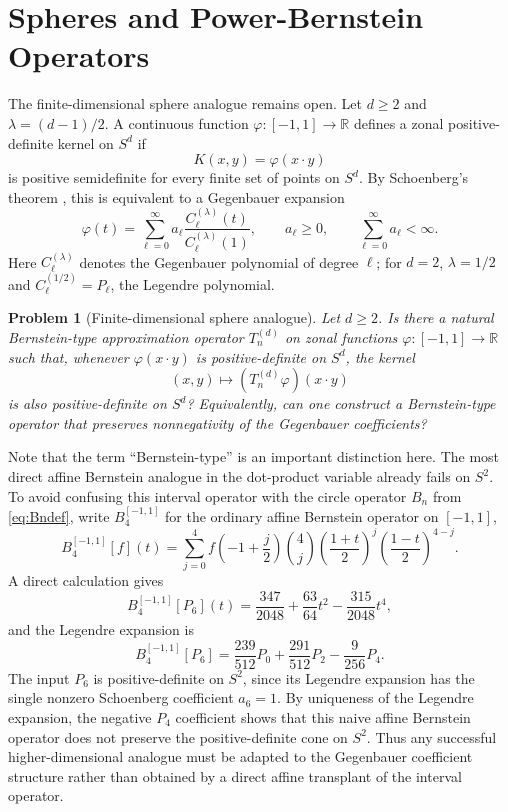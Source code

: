 \documentclass[10pt,a4paper]{amsart}
\newtheorem{problem}[theorem]{Problem}
\begin{document}
\section{Spheres and Power-Bernstein Operators}

The finite-dimensional sphere analogue remains open. Let $d \ge 2$ and $\lambda = (d-1)/2 $. A continuous function $\varphi:[-1,1] \to \mathbb R$ defines a zonal positive-definite kernel on $S^d$ if
\[
K(x,y)=\varphi(x\cdot y)
\]
is positive semidefinite for every finite set of points on $S^d$. By Schoenberg's theorem \cite{Schoenberg1942PositiveDF,Gneiting2013Spheres}, this is equivalent to a Gegenbauer expansion
\[
\varphi(t)=\sum_{\ell=0}^{\infty} a_\ell
\frac{C_\ell^{(\lambda)}(t)}{C_\ell^{(\lambda)}(1)},
\qquad a_\ell\ge0,
\qquad \sum_{\ell=0}^{\infty}a_\ell<\infty.
\]
Here $C_\ell^{(\lambda)}$ denotes the Gegenbauer polynomial of degree $\ell$; for $d=2$, $\lambda=1/2$ and $C_\ell^{(1/2)}=P_\ell$, the Legendre polynomial.

\begin{problem}[Finite-dimensional sphere analogue]
\label{conj:spheres}
Let $d\ge2$. Is there a natural Bernstein-type approximation operator $T_n^{(d)}$ on zonal functions $\varphi:[-1,1]\to\mathbb R$ such that, whenever $\varphi(x\cdot y)$ is positive-definite on $S^d$, the kernel
\[
(x,y)\mapsto (T_n^{(d)}\varphi)(x\cdot y)
\]
is also positive-definite on $S^d$? Equivalently, can one construct a Bernstein-type operator that preserves nonnegativity of the Gegenbauer coefficients?
\end{problem}

Note that the term ``Bernstein-type'' is an important distinction here. The most direct affine Bernstein analogue in the dot-product variable already fails on $S^2$. To avoid confusing this interval operator with the circle operator $B_n$ from \eqref{eq:Bndef}, write $B_4^{[-1,1]}$ for the ordinary affine Bernstein operator on $[-1,1]$,
\[
B_4^{[-1,1]}[f](t) =\sum_{j=0}^{4} f\!\left(-1+\frac{j}{2}\right)
\binom{4}{j}\left(\frac{1+t}{2}\right)^j
\left(\frac{1-t}{2}\right)^{4-j}.
\]
A direct calculation gives
\[
B_4^{[-1,1]}[P_6](t) = \frac{347}{2048}+\frac{63}{64}t^2-\frac{315}{2048}t^4,
\]
and the Legendre expansion is
\[
B_4^{[-1,1]}[P_6]
=\frac{239}{512}P_0+\frac{291}{512}P_2-\frac{9}{256}P_4.
\]
The input $P_6$ is positive-definite on $S^2$, since its Legendre expansion has the single nonzero Schoenberg coefficient $a_6=1$. By uniqueness of the Legendre expansion, the negative $P_4$ coefficient shows that this naive affine Bernstein operator does not preserve the positive-definite cone on $S^2$. Thus any successful higher-dimensional analogue must be adapted to the Gegenbauer coefficient structure rather than obtained by a direct affine transplant of the interval operator.
\end{document}
